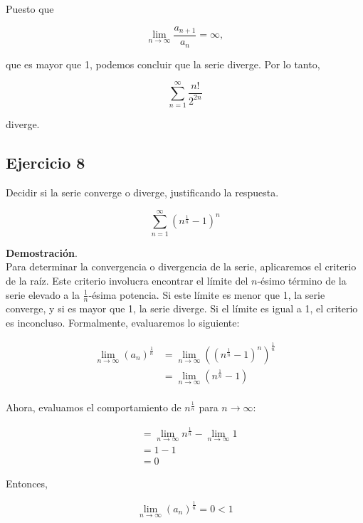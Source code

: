 \documentclass{article}
\begin{document}
    Puesto que

    $$
    \lim _{n \rightarrow \infty} \frac{a_{n+1}}{a_{n}} = \infty,
    $$

    que es mayor que 1, podemos concluir que la serie diverge. Por lo tanto,

    $$
    \sum_{n=1}^{\infty} \frac{n!}{2^{2 n}}
    $$

    diverge.

    \subsection*{Ejercicio 8}

    Decidir si la serie converge o diverge, justificando la respuesta.

    $$
    \sum_{n=1}^{\infty}\left(n^{\frac{1}{n}}-1\right)^{n}
    $$

    \textbf{Demostración}.\\

    Para determinar la convergencia o divergencia de la serie, aplicaremos el criterio de la raíz. Este criterio involucra encontrar el límite del \( n \)-ésimo término de la serie elevado a la \( \frac{1}{n} \)-ésima potencia. Si este límite es menor que 1, la serie converge, y si es mayor que 1, la serie diverge. Si el límite es igual a 1, el criterio es inconcluso. Formalmente, evaluaremos lo siguiente:

    \[
    \begin{align*}
    \lim _{n \rightarrow \infty}\left(a_{n}\right)^{\frac{1}{n}} & = \lim _{n \rightarrow \infty}\left(\left(n^{\frac{1}{n}}-1\right)^{n}\right)^{\frac{1}{n}} \\
    & = \lim _{n \rightarrow \infty}\left(n^{\frac{1}{n}}-1\right) \\
    \end{align*}
    \]

    Ahora, evaluamos el comportamiento de \( n^{\frac{1}{n}} \) para \( n \to \infty \):

    \[
    \begin{align*}
    & = \lim _{n \rightarrow \infty} n^{\frac{1}{n}} - \lim _{n \rightarrow \infty} 1 \\
    & = 1 - 1 \\
    & = 0
    \end{align*}
    \]

    Entonces,

    \[
    \lim _{n \rightarrow \infty}\left(a_{n}\right)^{\frac{1}{n}} = 0 < 1
    \]
\end{document}
